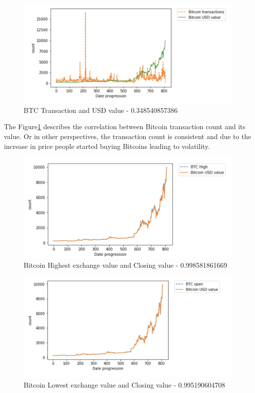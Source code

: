 \documentclass[sigconf]{acmart}
\begin{document}
\begin{figure}[!ht]
  \centering\includegraphics[width=\columnwidth]{images/BTC-prcvsBTC-trans.png}
  \caption{BTC Transaction and USD value - 0.348540857386 }
  \label{1}
\end{figure}

The Figure\ref{1} describes the correlation between Bitcoin transaction count and its value. Or in other perspectives, the transaction count is consistent and due to the increase in price people started buying Bitcoins leading to volatility.

\begin{figure}[!ht]
  \centering\includegraphics[width=\columnwidth]{images/High.png}
  \caption{Bitcoin Highest exchange value and Closing value - 0.998581861669  }
  \label{2}
\end{figure}

\begin{figure}[!ht]
  \centering\includegraphics[width=\columnwidth]{images/Open.png}
  \caption{Bitcoin Lowest exchange value and Closing value - 0.995190604708  }
  \label{3}
\end{figure}
\end{document}

